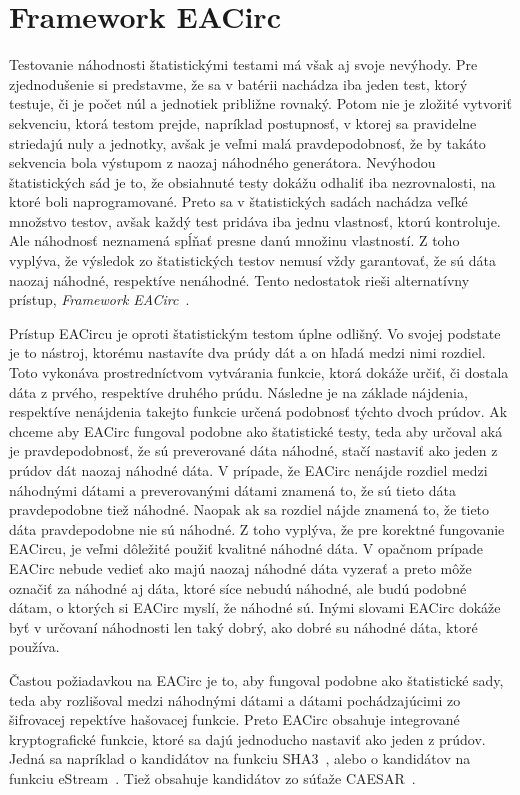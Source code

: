 \chapter{Framework EACirc}
\label{chap:eacirc}

Testovanie náhodnosti štatistickými testami má však aj svoje nevýhody. Pre zjednodušenie si predstavme, že sa v batérii nachádza iba jeden test, ktorý testuje, či je počet núl a jednotiek približne rovnaký. Potom nie je zložité vytvoriť sekvenciu, ktorá testom prejde, napríklad postupnosť, v ktorej sa pravidelne striedajú nuly a jednotky, avšak je veľmi malá pravdepodobnosť, že by takáto sekvencia bola výstupom z naozaj náhodného generátora. Nevýhodou štatistických sád je to, že obsiahnuté testy dokážu odhaliť iba nezrovnalosti, na ktoré boli naprogramované. Preto sa v štatistických sadách nachádza veľké množstvo testov, avšak každý test pridáva iba jednu vlastnosť, ktorú kontroluje. Ale náhodnosť neznamená spĺňať presne danú množinu vlastností. Z toho vyplýva, že výsledok zo štatistických testov nemusí vždy garantovať, že sú dáta naozaj náhodné, respektíve nenáhodné. Tento nedostatok rieši alternatívny prístup, \textit{Framework EACirc}~\parencite{ukrop-bc}. 

Prístup EACircu je oproti štatistickým testom úplne odlišný. Vo svojej podstate je to nástroj, ktorému nastavíte dva prúdy dát a on hľadá medzi nimi rozdiel. Toto vykonáva prostredníctvom vytvárania funkcie, ktorá dokáže určiť, či dostala dáta z prvého, respektíve druhého prúdu. Následne je na základe nájdenia, respektíve nenájdenia takejto funkcie určená podobnosť týchto dvoch prúdov. Ak chceme aby EACirc fungoval podobne ako štatistické testy, teda aby určoval aká je pravdepodobnosť, že sú preverované dáta náhodné, stačí nastaviť ako jeden z prúdov dát naozaj náhodné dáta. V prípade, že EACirc nenájde rozdiel medzi náhodnými dátami a preverovanými dátami znamená to, že sú tieto dáta pravdepodobne tiež náhodné. Naopak ak sa rozdiel nájde znamená to, že tieto dáta pravdepodobne nie sú náhodné. Z toho vyplýva, že pre korektné fungovanie EACircu, je veľmi dôležité použiť kvalitné náhodné dáta. V opačnom prípade EACirc nebude vedieť ako majú naozaj náhodné dáta vyzerať a preto môže označiť za náhodné aj dáta, ktoré síce nebudú náhodné, ale budú podobné dátam, o ktorých si EACirc myslí, že náhodné sú. Inými slovami EACirc dokáže byť v určovaní náhodnosti len taký dobrý, ako dobré su náhodné dáta, ktoré používa.

Častou požiadavkou na EACirc je to, aby fungoval podobne ako štatistické sady, teda aby rozlišoval medzi náhodnými dátami a dátami pochádzajúcimi zo šifrovacej repektíve hašovacej funkcie. Preto EACirc obsahuje integrované kryptografické funkcie, ktoré sa dajú jednoducho nastaviť ako jeden z prúdov. Jedná sa napríklad o kandidátov na funkciu SHA3~\cite{thesis-dubovec}, alebo o kandidátov na funkciu eStream~\parencite{thesis-pristak}. Tiež obsahuje kandidátov zo súťaže CAESAR~\cite{ukrop-master}. 


